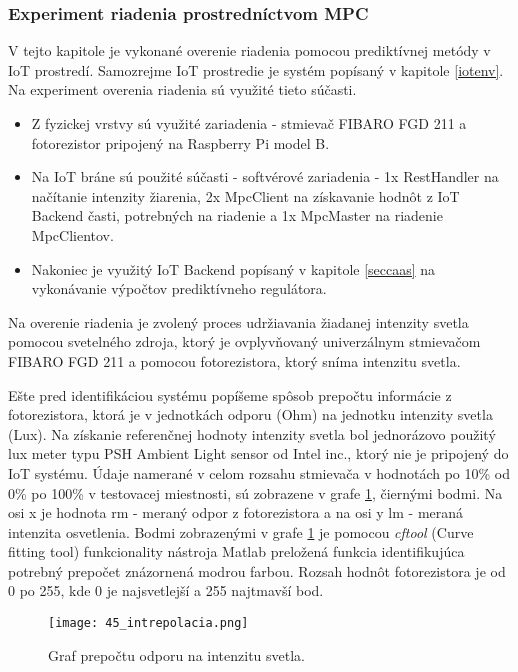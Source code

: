 \subsubsection{Experiment riadenia prostredníctvom MPC}
V tejto kapitole je vykonané overenie riadenia pomocou prediktívnej metódy v IoT prostredí. Samozrejme IoT prostredie je systém popísaný v kapitole \ref{iotenv}. Na experiment overenia riadenia sú využité tieto súčasti.
\begin{itemize}
\item Z fyzickej vrstvy sú využité zariadenia - stmievač FIBARO FGD 211 a fotorezistor pripojený na Raspberry Pi model B.
\item Na IoT bráne sú použité súčasti - softvérové zariadenia - 1x RestHandler na načítanie intenzity žiarenia, 2x MpcClient na získavanie hodnôt z IoT Backend časti, potrebných na riadenie a 1x MpcMaster na riadenie MpcClientov. 
\item Nakoniec je využitý IoT Backend popísaný v kapitole \ref{seccaas} na vykonávanie výpočtov prediktívneho regulátora.
\end{itemize}
Na overenie riadenia je zvolený proces udržiavania žiadanej intenzity svetla  pomocou svetelného zdroja, ktorý je ovplyvňovaný univerzálnym stmievačom FIBARO FGD 211 a pomocou fotorezistora, ktorý sníma intenzitu svetla.

\indent Ešte pred identifikáciou systému popíšeme spôsob prepočtu informácie z fotorezistora, ktorá je v jednotkách odporu (Ohm) na jednotku intenzity svetla (Lux). Na získanie referenčnej hodnoty intenzity svetla bol jednorázovo použitý lux meter typu PSH Ambient Light sensor od Intel inc., ktorý nie je pripojený do IoT systému. Údaje namerané v celom rozsahu stmievača v hodnotách po 10\% od 0\% po 100\% v testovacej miestnosti, sú zobrazene v grafe \ref{45_intrepolacia}, čiernými bodmi. Na osi x je hodnota rm - meraný odpor z fotorezistora a na osi y lm - meraná intenzita osvetlenia. Bodmi zobrazenými v grafe \ref{45_intrepolacia} je pomocou \textit{cftool} (Curve fitting tool) funkcionality nástroja Matlab preložená funkcia identifikujúca potrebný prepočet znázornená modrou farbou. Rozsah hodnôt fotorezistora je od 0 po 255, kde 0 je najsvetlejší a 255 najtmavší bod.
\begin{figure}[!htbp]
\centering
\texttt{[image: 45\_intrepolacia.png]}
\caption{Graf prepočtu odporu na intenzitu svetla.}
\label{45_intrepolacia}
\end{figure}

